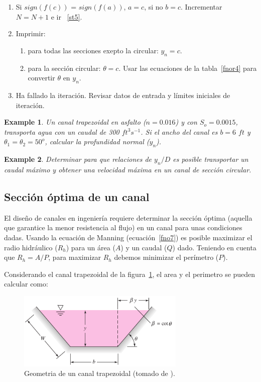 \documentclass[11pt, oneside]{article}
\newtheorem{exa}{Example}
\begin{document}
\begin{enumerate}
\item \label{st4} Si $sign(f(c))$ = $sign(f(a))$, $a=c$, si no $b=c$. Incrementar $N=N+1$ e ir ~\ref{st5}. 

\item \label{st2} Imprimir:
\begin{enumerate}
\item para todas las secciones exepto la circular: $y_n = c$.
\item para la secci\'on circular: $\theta = c$. Usar las ecuaciones de la tabla~\ref{fnor4} para convertir $\theta$ en $y_n$.
\end{enumerate}

\item \label{st3} Ha fallado la iteraci\'on. Revisar datos de entrada y l\'imites iniciales de iteraci\'on.

\end{enumerate}

\begin{shaded}
\begin{exa}
Un canal trapezoidal en asfalto ($n=0.016$) y con $S_o = 0.0015$, transporta agua con un caudal de 300 $ft^3 s^{-1}$. Si el ancho del canal es $b=6$ $ft$ y $\theta_1 = \theta_2 = 50^o$, calcular la profundidad normal ($y_n$).
\end{exa}
\end{shaded}

\begin{shaded}
\begin{exa}
Determinar para que relaciones de $y_n /D$ es posible transportar un caudal m\'aximo y obtener una velocidad m\'axima en un canal de secci\'on circular.
\end{exa}
\end{shaded}


\subsection{Secci\'on \'optima de un canal}
El dise\~no de canales en ingenier\'ia requiere determinar la secci\'on \'optima (aquella que garantice la menor resistencia al flujo) en un canal para unas condiciones dadas. Usando la ecuaci\'on de Manning (ecuaci\'on~\ref{fno7}) es posible maximizar el radio hidr\'aulico ($R_h$) para un \'area ($A$) y un caudal ($Q$) dado. Teniendo en cuenta que $R_h = A/P$, para maximizar $R_h$ debemos minimizar el per\'imetro ($P$). 

Considerando el canal trapezoidal de la figura~\ref{fnor6}, el area y el perimetro se pueden calcular como:
\begin{figure}[h!]
\centering
\includegraphics[width=8cm]{fnor6.png}
\caption{Geometria de un canal trapezoidal (tomado de \cite{white1990fluid}).}
\label{fnor6}
\end{figure}
\end{document}
